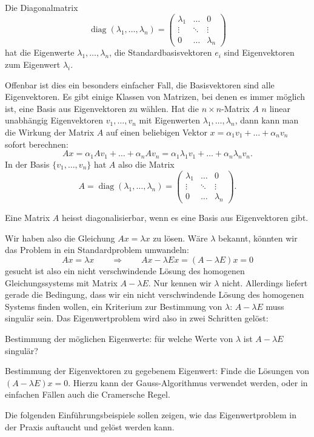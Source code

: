 \begin{hilfssatz}
Die Diagonalmatrix
\[
\operatorname{diag}(\lambda_1,\dots,\lambda_n)
=\begin{pmatrix}
\lambda_1&\dots&0\\
\vdots&\ddots&\vdots\\
0&\dots&\lambda_n
\end{pmatrix}
\]
hat die Eigenwerte $\lambda_1,\dots,\lambda_n$, die Standardbasisvektoren
$e_i$ sind Eigenvektoren zum Eigenwert $\lambda_i$.
\end{hilfssatz}
Offenbar ist dies ein besonders einfacher Fall, die Basisvektoren sind
alle Eigenvektoren.
Es gibt einige Klassen von Matrizen, bei denen es
immer möglich ist, eine Basis aus Eigenvektoren zu wählen.
Hat die
$n\times n$-Matrix $A$ $n$ linear unabhängig Eigenvektoren $v_1,\dots,v_n$
mit Eigenwerten $\lambda_1,\dots,\lambda_n$, dann kann man die Wirkung
der Matrix $A$ auf einen beliebigen Vektor $x=\alpha_1v_1+\dots+\alpha_nv_n$
sofort berechnen:
\[
Ax=\alpha_1Av_1+\dots+\alpha_nAv_n=\alpha_1\lambda_1v_1+\dots+\alpha_n\lambda_nv_n.
\]
In der Basis $\{v_1,\dots,v_n\}$ hat $A$ also die Matrix
\[
A=\operatorname{diag}(\lambda_1,\dots,\lambda_n)
=
\begin{pmatrix}
\lambda_1&\dots&0\\
\vdots&\ddots&\vdots\\
0&\dots&\lambda_n
\end{pmatrix}.
\]
\begin{definition}
Eine Matrix $A$ heisst diagonalisierbar, wenn es eine Basis aus
Eigenvektoren gibt.
\end{definition}

Wir haben also die Gleichung $Ax=\lambda x$ zu lösen.
Wäre $\lambda$ bekannt, könnten wir das Problem in ein Standardproblem
umwandeln:
\[
Ax=\lambda x\qquad\Rightarrow\qquad Ax-\lambda Ex=(A-\lambda E)x=0
\]
gesucht ist also ein nicht verschwindende Lösung des homogenen
Gleichungssystems mit
Matrix $A-\lambda E$.
Nur kennen wir $\lambda$ nicht.
Allerdings
liefert gerade die Bedingung, dass wir ein nicht verschwindende
Lösung des homogenen Systems finden wollen, ein Kriterium zur
Bestimmung von $\lambda$: $A-\lambda E$ muss singulär sein.
Das Eigenwertproblem wird also in zwei Schritten gelöst:
\begin{compactenum}
\item Bestimmung der möglichen Eigenwerte: für welche Werte von $\lambda$
ist $A-\lambda E$ singulär?
\item Bestimmung der Eigenvektoren zu gegebenem Eigenwert: Finde die
Lösungen von $(A-\lambda E)x=0$.
Hierzu kann der Gauss-Algorithmus
verwendet werden, oder in einfachen Fällen auch die Cramersche Regel.
\end{compactenum}
Die folgenden Einführungsbeispiele sollen zeigen, wie das Eigenwertproblem
in der Praxis auftaucht und gelöst werden kann.

